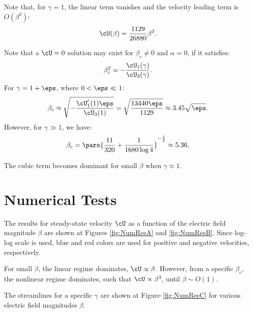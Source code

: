 Note that, for $\gamma = 1$, the linear term vanishes and the velocity leading term is $O(\beta^3)$:
\begin{eqnarray*}
\cU(\beta) = \frac{1129}{26880}\beta^3.
\end{eqnarray*}

Note that a $\cU = 0$ solution may exist for $\beta_c \ne 0$ and $\alpha = 0$, 
if it satisfies:
\begin{eqnarray*}
\beta_c^2 = -\frac{\cU_1(\gamma)}{\cU_3(\gamma)}.
\end{eqnarray*}
For $\gamma = 1 + \eps$, where $0 < \eps \ll 1$:
\begin{eqnarray*}
\beta_c \approx \sqrt{-\frac{\cU_1'(1) \eps}{\cU_3(1)}} = 
 \sqrt{\frac{13440 \eps}{1129}} \approx 3.45 \sqrt{\eps}.
\end{eqnarray*}
However, for $\gamma \gg 1$, we have:
\begin{eqnarray*}
\beta_c =  \pars{\frac{11}{320} + \frac{1}{1680 \log 4}}^{-\frac{1}{2}} \approx 5.36.
\end{eqnarray*}

The cubic term becomes dominant for small $\beta$ when $\gamma \approx 1$.

\section{Numerical Tests} \label{results}
The results for steady-state velocity $\cU$ as a function of the electric field magnitude $\beta$
are shown at Figures \ref{fig:NumResA} and \ref{fig:NumResB}. 
Since log-log scale is used, blue and red colors are used 
for positive and negative velocities, respectively.

For small $\beta$, the linear regime dominates, $\cU \propto \beta$. 
However, from a specific $\beta_c$, the nonlinear regime dominates, such that
$\cU \propto \beta^3$, until $\beta \sim O(1)$.

The streamlines for a specific $\gamma$ are shown at Figure \ref{fig:NumResC} for
various electric field magnitudes $\beta$.

